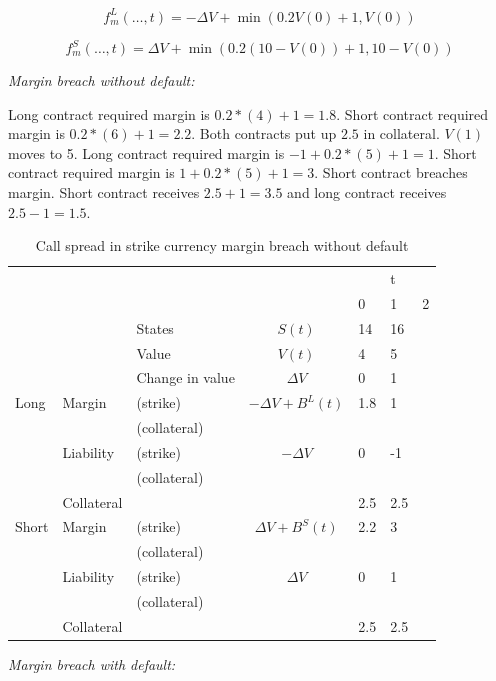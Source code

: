 \documentclass[12pt]{article}
\begin{document}
\[f_m^L(\ldots,t) = -\Delta V + \min(0.2 V(0) + 1, V(0))\]

\[f_m^S(\ldots,t) = \Delta V + \min(0.2 (10-V(0)) + 1, 10 - V(0))\]

\textit{Margin breach without default:}


Long contract required margin is $0.2 *(4) + 1 = 1.8$. Short contract required margin is $0.2 *(6)+ 1 = 2.2$. Both contracts put up $2.5$ in collateral.
$V(1)$ moves to 5. Long contract required margin is $-1+0.2*(5) +1 = 1$. Short contract required margin is $ 1 + 0.2*(5)+ 1 = 3$. Short contract breaches margin. Short contract receives $2.5 +1 = 3.5$ and long contract receives $2.5 - 1 = 1.5$.

\begin{table}
\begin{tabular}{lll|c|lll}
&  &  &  &  & t &\\  
&  &  &  & 0 & 1 & 2\\
\hline
\hline
&  & States &  $S(t)$ & 14 & 16 & \\
&  & Value  &  $V(t)$  & 4 & 5 &  \\
&  & Change in value & $\Delta V$ & 0& 1 &  \\
\hline
Long      & Margin    & (strike)     & $-\Delta V + B^L(t)$ & 1.8 & 1 &  \\
          &           & (collateral) & & & &\\ 
          & Liability & (strike)     & $-\Delta V$ & 0 & -1 & \\ 
          &           & (collateral)& & & &\\
          & Collateral&                       &    & 2.5 & 2.5 & \\          
\hline          
Short     & Margin    & (strike)     & $\Delta V + B^S(t)$  & 2.2 & 3 & \\
          &           & (collateral) & & & &\\
          & Liability & (strike)     & $\Delta V$ & 0 & 1 & \\
          &           & (collateral) & & & &\\
          & Collateral&                       &    & 2.5 & 2.5 & \\ 
          

\end{tabular}
\caption{Call spread in strike currency margin breach without default}
\label{fut}
\end{table}



\textit{Margin breach with default:}
\end{document}
